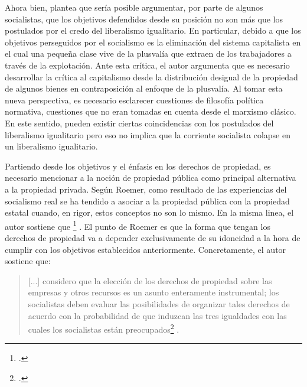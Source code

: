 Ahora bien, \citet{Roemer_1994} plantea que sería posible argumentar, por parte de algunos socialistas, que los objetivos defendidos desde su posición no son más que los postulados por el credo del liberalismo igualitario. En particular, debido a que los objetivos perseguidos por el socialismo es la eliminación del sistema capitalista en el cual una pequeña clase vive de la plusvalía que extraen de los trabajadores a través de la explotación. Ante esta crítica, el autor argumenta que es necesario desarrollar la crítica al capitalismo desde la distribución desigual de la propiedad de algunos bienes en contraposición al enfoque de la plusvalía. Al tomar esta nueva perspectiva, es necesario esclarecer cuestiones de filosofía política normativa, cuestiones que no eran tomadas en cuenta desde el marxismo clásico. En este sentido, pueden existir ciertas coincidencias con los postulados del liberalismo igualitario pero eso no implica que la corriente socialista colapse en un liberalismo igualitario. 

Partiendo desde los objetivos y el énfasis en los derechos de propiedad, es necesario mencionar a la noción de propiedad pública como principal alternativa a la propiedad privada. Según Roemer, como resultado de las experiencias del socialismo real se ha tendido a asociar a la propiedad pública con la propiedad estatal cuando, en rigor, estos conceptos no son lo mismo. En la misma linea, el autor sostiene que \footnote{ \citep[p. 20]{Roemer_1994}.} \citep[p. 20]{Roemer_1994}. El punto de Roemer es que la forma que tengan los derechos de propiedad va a depender exclusivamente de su idoneidad a la hora de cumplir con los objetivos establecidos anteriormente. Concretamente, el autor sostiene que: 

\vspace{3mm}
\begin{quote}
[...] considero que la elección de los derechos de propiedad sobre las empresas y otros recursos es un asunto enteramente instrumental; los socialistas deben evaluar las posibilidades de organizar tales derechos de acuerdo con la probabilidad de que induzcan las tres igualdades con las cuales los socialistas están preocupados\footnote{ \citep[p. 23]{Roemer_1994}.} \citep[p. 23]{Roemer_1994}.    
\end{quote}
\vspace{3mm}

